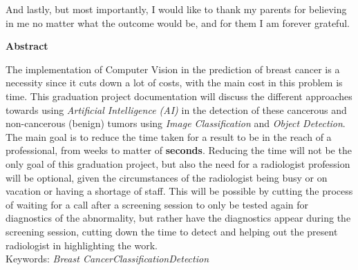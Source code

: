 \documentclass[12pt]{extarticle}
\begin{document}
	And lastly, but most importantly, I would like to thank my parents for believing in me no matter what the outcome would be, and for them I am forever grateful.
	\newpage
	\begin{center}
		\LARGE{\textbf{Abstract}}\\ \vspace{1cm}
	\end{center}
	The implementation of Computer Vision in the prediction of breast cancer is a necessity since it cuts down a lot of costs, with the main cost in this problem is time. This graduation project documentation will discuss the different approaches towards using \emph{Artificial Intelligence (AI)} in the detection of these cancerous and non-cancerous (benign) tumors using \emph{Image Classification} and \emph{Object Detection}. The main goal is to reduce the time taken for a result to be in the reach of a professional, from weeks to matter of \textbf{seconds}. Reducing the time will not be the only goal of this graduation project, but also the need for a radiologist profession will be optional, given the circumstances of the radiologist being busy or on vacation or having a shortage of staff. This will be possible by cutting the process of waiting for a call after a screening session to only be tested again for diagnostics of the abnormality, but rather have the diagnostics appear during the screening session, cutting down the time to detect and helping out the present radiologist in highlighting the work.\\[10mm]
	Keywords: \emph{Breast Cancer\quad Classification\quad Detection}
	\newpage
	\tableofcontents
	\listoffigures
	\lstlistoflistings
	\listoftables
	
\end{document}
